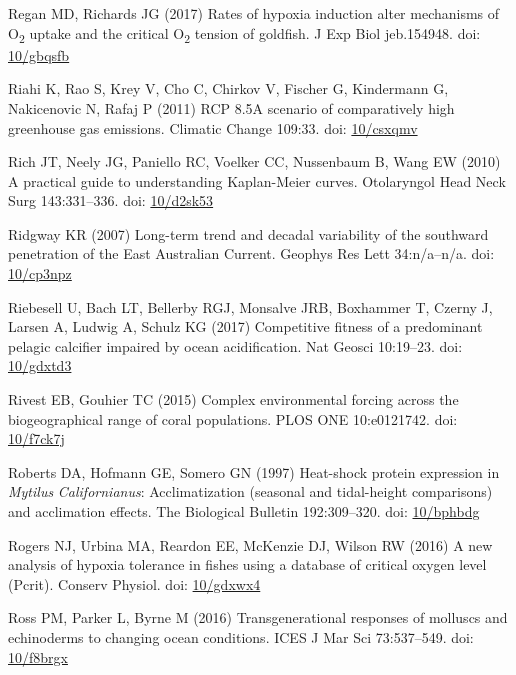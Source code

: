 \documentclass[a4paper,10pt, oneside]{memoir}
\begin{document}
\leavevmode\hypertarget{ref-Regan2017}{}%
Regan MD, Richards JG (2017) Rates of hypoxia induction alter mechanisms of O\textsubscript{2} uptake and the critical O\textsubscript{2} tension of goldfish. J Exp Biol jeb.154948. doi: \href{https://doi.org/10/gbqsfb}{10/gbqsfb}

\leavevmode\hypertarget{ref-Riahi2011}{}%
Riahi K, Rao S, Krey V, Cho C, Chirkov V, Fischer G, Kindermann G, Nakicenovic N, Rafaj P (2011) RCP 8.5A scenario of comparatively high greenhouse gas emissions. Climatic Change 109:33. doi: \href{https://doi.org/10/csxqmv}{10/csxqmv}

\leavevmode\hypertarget{ref-Rich2010}{}%
Rich JT, Neely JG, Paniello RC, Voelker CC, Nussenbaum B, Wang EW (2010) A practical guide to understanding Kaplan-Meier curves. Otolaryngol Head Neck Surg 143:331--336. doi: \href{https://doi.org/10/d2sk53}{10/d2sk53}

\leavevmode\hypertarget{ref-Ridgway2007}{}%
Ridgway KR (2007) Long-term trend and decadal variability of the southward penetration of the East Australian Current. Geophys Res Lett 34:n/a--n/a. doi: \href{https://doi.org/10/cp3npz}{10/cp3npz}

\leavevmode\hypertarget{ref-Riebesell2017}{}%
Riebesell U, Bach LT, Bellerby RGJ, Monsalve JRB, Boxhammer T, Czerny J, Larsen A, Ludwig A, Schulz KG (2017) Competitive fitness of a predominant pelagic calcifier impaired by ocean acidification. Nat Geosci 10:19--23. doi: \href{https://doi.org/10/gdxtd3}{10/gdxtd3}

\leavevmode\hypertarget{ref-Rivest2015}{}%
Rivest EB, Gouhier TC (2015) Complex environmental forcing across the biogeographical range of coral populations. PLOS ONE 10:e0121742. doi: \href{https://doi.org/10/f7ck7j}{10/f7ck7j}

\leavevmode\hypertarget{ref-Roberts1997}{}%
Roberts DA, Hofmann GE, Somero GN (1997) Heat-shock protein expression in \emph{Mytilus} \emph{Californianus}: Acclimatization (seasonal and tidal-height comparisons) and acclimation effects. The Biological Bulletin 192:309--320. doi: \href{https://doi.org/10/bphbdg}{10/bphbdg}

\leavevmode\hypertarget{ref-Rogers2016}{}%
Rogers NJ, Urbina MA, Reardon EE, McKenzie DJ, Wilson RW (2016) A new analysis of hypoxia tolerance in fishes using a database of critical oxygen level (Pcrit). Conserv Physiol. doi: \href{https://doi.org/10/gdxwx4}{10/gdxwx4}

\leavevmode\hypertarget{ref-Ross2016}{}%
Ross PM, Parker L, Byrne M (2016) Transgenerational responses of molluscs and echinoderms to changing ocean conditions. ICES J Mar Sci 73:537--549. doi: \href{https://doi.org/10/f8brgx}{10/f8brgx}
\end{document}
